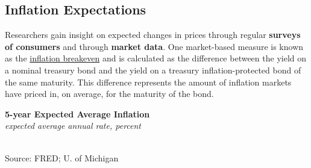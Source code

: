 \documentclass{report}
\makeatletter
\newcommand{\tbllink}[1]{\href{https://raw.githubusercontent.com/bdecon/US-chartbook/master/chartbook/data/#1}{\faTable}}
\newcommand*\short[1]{\expandafter\@gobbletwo\number\numexpr#1\relax}
\newcommand{\stdnode}[3]{\node[below, align=left, shift=({#1,#2})]{#3};}
\newcommand{\ltdateaxisticks}{
		date coordinates in=x, axis line style={draw=none},
		xmax={2021-06-15},
		max space between ticks=40,	    
		xtick={{2015-01-01}, {2016-01-01}, {2017-01-01}, {2018-01-01}, 
		    {2019-01-01}, {2020-01-01}, {2021-01-01}},
		enlarge y limits={0.06}, enlarge x limits={0.01},
		}
\newcommand{\bbar}[2]{extra #1 ticks = {{#2}}, extra #1 tick labels = ,
		extra #1 tick style = {grid=major, grid style={thick, black!25}},}
\newcommand{\stdline}[4]{\addplot[very thick, no markers, color=#1] 
		table [x=#2, y=#3, col sep=comma] {#4};	}
\newcommand{\thinline}[4]{\addplot[no markers, color=#1] 
		table [x=#2, y=#3, col sep=comma] {#4};	}
\makeatother
\begin{document}
{{\subsection*{\color{black!70} \seriffont Inflation Expectations}
\begin{minipage}{0.76\textwidth}
\small Researchers gain insight on expected changes in prices through regular \textbf{surveys of consumers} and through \textbf{market data}. One market-based measure is known as the \href{https://fred.stlouisfed.org/series/T5YIE}{inflation breakeven} and is calculated as the difference between the yield on a nominal treasury bond and the yield on a treasury inflation-protected bond of the same maturity. This difference represents the amount of inflation markets have priced in, on average, for the maturity of the bond.
\end{minipage}

\begin{minipage}{0.36\textwidth}
\normalsize \textbf{5-year Expected Average Inflation}\\
\footnotesize{\textit{expected average annual rate, percent}}\\
\hspace*{-2mm} \\
\footnotesize{Source: FRED; U. of Michigan} \hfill \tbllink{infbreak.csv}
\end{minipage} \hspace{6mm} 
\begin{minipage}{0.35\textwidth}
\small 


\end{minipage}
\vspace{1mm}

\begin{minipage}{0.76\textwidth}


\end{minipage}}}
\end{document}
